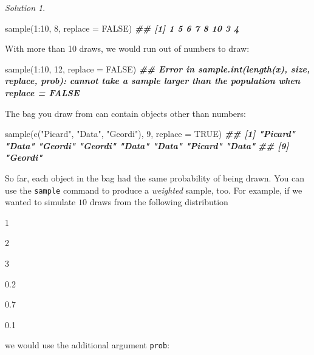 \documentclass[
]{book}
\newenvironment{Shaded}{\begin{snugshade}}{\end{snugshade}}
\newcommand{\AttributeTok}[1]{\textcolor[rgb]{0.77,0.63,0.00}{#1}}
\newcommand{\ConstantTok}[1]{\textcolor[rgb]{0.00,0.00,0.00}{#1}}
\newcommand{\DecValTok}[1]{\textcolor[rgb]{0.00,0.00,0.81}{#1}}
\newcommand{\DocumentationTok}[1]{\textcolor[rgb]{0.56,0.35,0.01}{\textbf{\textit{#1}}}}
\newcommand{\FunctionTok}[1]{\textcolor[rgb]{0.00,0.00,0.00}{#1}}
\newcommand{\NormalTok}[1]{#1}
\newcommand{\SpecialCharTok}[1]{\textcolor[rgb]{0.00,0.00,0.00}{#1}}
\newcommand{\StringTok}[1]{\textcolor[rgb]{0.31,0.60,0.02}{#1}}
\theoremstyle{definition}
\theoremstyle{definition}
\theoremstyle{definition}
\theoremstyle{definition}
\theoremstyle{remark}
\newtheorem*{solution}{Solution}
\begin{document}
\begin{solution}
\begin{Shaded}
\begin{Highlighting}[]
\FunctionTok{sample}\NormalTok{(}\DecValTok{1}\SpecialCharTok{:}\DecValTok{10}\NormalTok{, }\DecValTok{8}\NormalTok{, }\AttributeTok{replace =} \ConstantTok{FALSE}\NormalTok{)}
\DocumentationTok{\#\# [1]  1  5  6  7  8 10  3  4}
\end{Highlighting}
\end{Shaded}

With more than 10 draws, we would run out of numbers to draw:

\begin{Shaded}
\begin{Highlighting}[]
\FunctionTok{sample}\NormalTok{(}\DecValTok{1}\SpecialCharTok{:}\DecValTok{10}\NormalTok{, }\DecValTok{12}\NormalTok{, }\AttributeTok{replace =} \ConstantTok{FALSE}\NormalTok{)}
\DocumentationTok{\#\# Error in sample.int(length(x), size, replace, prob): cannot take a sample larger than the population when \textquotesingle{}replace = FALSE\textquotesingle{}}
\end{Highlighting}
\end{Shaded}

The bag you draw from can contain objects other than numbers:

\begin{Shaded}
\begin{Highlighting}[]
\FunctionTok{sample}\NormalTok{(}\FunctionTok{c}\NormalTok{(}\StringTok{"Picard"}\NormalTok{, }\StringTok{"Data"}\NormalTok{, }\StringTok{"Geordi"}\NormalTok{), }\DecValTok{9}\NormalTok{, }\AttributeTok{replace =} \ConstantTok{TRUE}\NormalTok{)}
\DocumentationTok{\#\# [1] "Picard" "Data"   "Geordi" "Geordi" "Data"   "Data"   "Picard" "Data"  }
\DocumentationTok{\#\# [9] "Geordi"}
\end{Highlighting}
\end{Shaded}

So far, each object in the bag had the same probability of being drawn. You can
use the \texttt{sample} command to produce a \emph{weighted} sample, too. For example, if we
wanted to simulate \(10\) draws from the following distribution

1

2

3

0.2

0.7

0.1

we would use the additional argument \texttt{prob}:


\end{solution}
\end{document}
